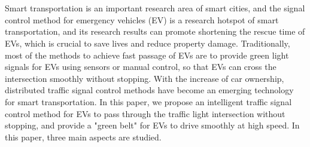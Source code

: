 \newpage
\vspace{-1cm}
\chapter*{}
\vspace{-0.5cm}



Smart transportation is an important research area of smart cities, and the signal control method for emergency vehicles (EV) is a research hotspot of smart transportation, and its research results can promote shortening the rescue time of EVs, which is crucial to save lives and reduce property damage. Traditionally, most of the methods to achieve fast passage of EVs are to provide green light signals for EVs using sensors or manual control, so that EVs can cross the intersection smoothly without stopping. With the increase of car ownership, distributed traffic signal control methods have become an emerging technology for smart transportation. In this paper, we propose an intelligent traffic signal control method for EVs to pass through the traffic light intersection without stopping, and provide a "green belt" for EVs to drive smoothly at high speed. In this paper, three main aspects are studied.

